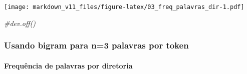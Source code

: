 \documentclass[]{article}
\newenvironment{Shaded}{\begin{snugshade}}{\end{snugshade}}
\newcommand{\CommentTok}[1]{\textcolor[rgb]{0.56,0.35,0.01}{\textit{#1}}}
\let\oldparagraph\paragraph
\renewcommand{\paragraph}[1]{\oldparagraph{#1}\mbox{}}
\begin{document}
\texttt{[image: markdown\_v11\_files/figure-latex/03\_freq\_palavras\_dir-1.pdf]}

\begin{Shaded}
\begin{Highlighting}[]
\CommentTok{#dev.off()}
\end{Highlighting}
\end{Shaded}

\subsubsection{Usando bigram para n=3 palavras por
token}\label{usando-bigram-para-n3-palavras-por-token}

\paragraph{Frequência de palavras por
diretoria}\label{frequencia-de-palavras-por-diretoria-2}
\end{document}
